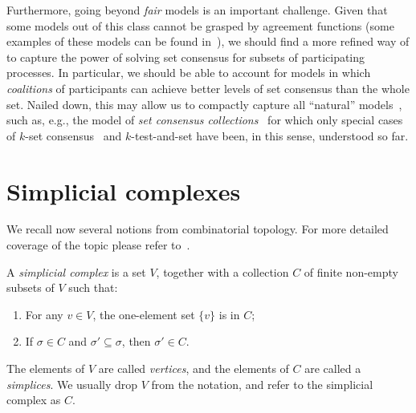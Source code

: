 \documentclass[a4paper]{article}
\def\fair{\textit{fair}}
\begin{document}
Furthermore, going beyond {\fair} models is an important
challenge.
%
Given that some models out of this class cannot be grasped by
agreement functions (some examples of these models can be found
in~\cite{KR17}), we should find a more refined
way of to capture the power of solving set
consensus for subsets of participating processes. In particular, we should be able to account for models
in which \emph{coalitions} of participants can achieve better levels of set
consensus than the whole set.  
%
Nailed down, this may allow us to compactly capture all ``natural''
models~\cite{GHKR16},  such as, e.g., the model of \emph{set
consensus collections}~\cite{DFGK16} for which only special cases of
$k$-set consensus~\cite{GHKR16} and $k$-test-and-set have
been, in this sense, understood so far. 





\newpage

\appendix 

\section{Simplicial complexes}
\label{app:topprimer}

We recall now several notions from combinatorial topology. For more detailed coverage of the topic please refer
to~\cite{Spanier,HKR14}.

A {\em simplicial complex} is a set $V$, together with a collection $C$ of finite non-empty subsets of $V$ such
that:
\begin{enumerate}
\item For any $v \in V$, the one-element set $\{v\}$ is in $C$;
\item If $\sigma \in C$ and $\sigma' \subseteq \sigma$, then $\sigma' \in C$.
\end{enumerate}

The elements of $V$ are called {\em vertices}, and the elements of $C$ are called a {\em simplices}. We usually
drop $V$ from the notation, and refer to the simplicial complex as $C$.

\end{document}
